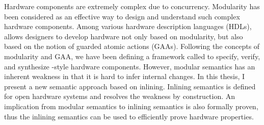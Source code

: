 % 
% 
%

Hardware components are extremely complex due to concurrency.
Modularity has been considered as an effective way to design and
understand such complex hardware components. Among various hardware
description languages (HDLs), \Bluespec{} allows designers to develop
hardware not only based on modularity, but also based on the notion of
guarded atomic actions (GAAs). Following the concepts of modularity
and GAA, we have been defining a framework called \Kami{} to specify,
verify, and synthesize \Bluespec{}-style hardware components. However,
modular semantics has an inherent weakness in that it is hard to infer
internal changes. In this thesis, I present a new semantic approach
based on inlining. Inlining semantics is defined for open hardware
systems and resolves the weakness by construction.  An implication
from modular semantics to inlining semantics is also formally proven,
thus the inlining semantics can be used to efficiently prove hardware
properties.

